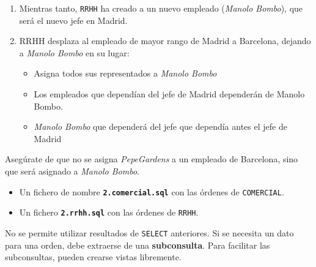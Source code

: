 \begin{homeworkProblem}

  {

    \begin{enumerate}
    \item Mientras tanto, \texttt{RRHH} ha creado a un nuevo empleado (\textit{Manolo Bombo}), que será el nuevo jefe en Madrid.
    \item RRHH desplaza al empleado de mayor rango de Madrid a Barcelona, dejando a \textit{Manolo Bombo} en su lugar:
      \begin{itemize}
      \item Asigna todos sus representados a \textit{Manolo Bombo}
      \item Los empleados que dependían del jefe de Madrid dependerán de Manolo Bombo.
      \item \textit{Manolo Bombo} que dependerá del jefe que dependía antes el jefe de Madrid
      \end{itemize}
    \end{enumerate}
  }
  Asegúrate de que no se asigna \textit{PepeGardens} a un empleado de Barcelona, sino que será asignado a \textit{Manolo Bombo}.

  \begin{Aviso}
    \begin{itemize}
    \item Un fichero de nombre \textbf{\texttt{2.comercial.sql}} con las órdenes de \texttt{COMERCIAL}.
    \item Un fichero \textbf{\texttt{2.rrhh.sql}} con las órdenes de \texttt{RRHH}.
    \end{itemize}

    
    No se permite utilizar resultados de \texttt{SELECT} anteriores. Si se necesita un dato para una orden, debe extraerse de una \textbf{subconsulta}. Para facilitar las subconsultas, pueden crearse vistas libremente.
  \end{Aviso}

\end{homeworkProblem}

